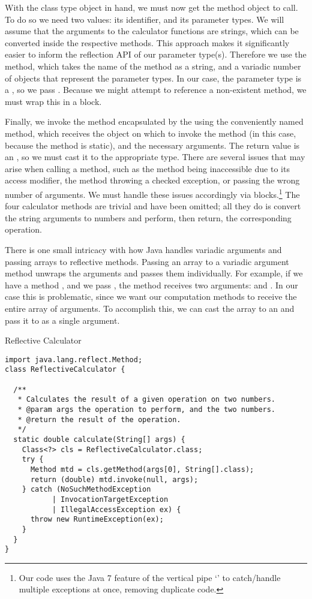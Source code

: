 With the class type object in hand, we must now get the method object to call. To do so we need two values: its identifier, and its parameter types. We will assume that the arguments to the calculator functions are strings, which can be converted inside the respective methods. This approach makes it significantly easier to inform the reflection API of our parameter type(s). Therefore we use the  method, which takes the name of the method as a string, and a variadic number of  objects that represent the parameter types. In our case, the parameter type is a , so we pass . Because we might attempt to reference a non-existent method, we must wrap this in a  block.

Finally, we invoke the method encapsulated by the  using the conveniently named  method, which receives the object on which to invoke the method (in this case,  because the method is static), and the necessary arguments. The return value is an , so we must cast it to the appropriate type. There are several issues that may arise when calling a method, such as the method being inaccessible due to its access modifier, the method throwing a checked exception, or passing the wrong number of arguments. We must handle these issues accordingly via  blocks.\footnote{Our code uses the Java 7 feature of the vertical pipe `\ttt{|}' to catch/handle multiple exceptions at once, removing duplicate code.} The four calculator methods are trivial and have been omitted; all they do is convert the string arguments to numbers and perform, then return, the corresponding operation.

There is one small intricacy with how Java handles variadic arguments and passing arrays to reflective methods. Passing an array to a variadic argument method unwraps the arguments and passes them individually. For example, if we have a method , and we pass , the method receives two arguments:  and . In our case this is problematic, since we want our computation methods to receive the entire array of arguments. To accomplish this, we can cast the array to an  and pass it to  as a single argument.

\begin{cl}[]{Reflective Calculator}
\begin{lstlisting}[language=MyJava]
import java.lang.reflect.Method;
class ReflectiveCalculator {

  /**
   * Calculates the result of a given operation on two numbers.
   * @param args the operation to perform, and the two numbers.
   * @return the result of the operation.
   */
  static double calculate(String[] args) {
    Class<?> cls = ReflectiveCalculator.class;
    try {
      Method mtd = cls.getMethod(args[0], String[].class);
      return (double) mtd.invoke(null, args);
    } catch (NoSuchMethodException
           | InvocationTargetException
           | IllegalAccessException ex) {
      throw new RuntimeException(ex);
    }
  }
}
\end{lstlisting}
\end{cl}


